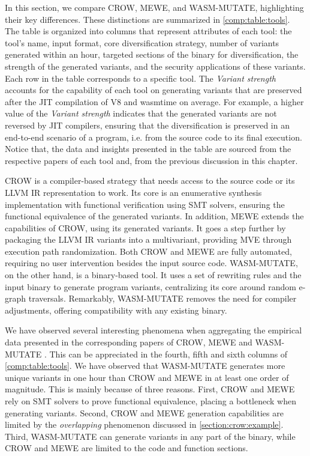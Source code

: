 
\label{discussion}

In this section, we compare CROW, MEWE, and WASM-MUTATE, highlighting their key differences. 
These distinctions are summarized in \autoref{comp:table:tools}. 
The table is organized into columns that represent attributes of each tool: the tool's name, input format, core diversification strategy, number of variants generated within an hour, targeted sections of the \Wasm binary for diversification, the strength of the generated variants, and the security applications of these variants. 
Each row in the table corresponds to a specific tool. 
The \emph{Variant strength} accounts for the capability of each tool on generating variants that are preserved after the JIT compilation of V8 and wasmtime on average.
For example, a higher value of the \emph{Variant strength} indicates that the generated variants are not reversed by JIT compilers, ensuring that the diversification is preserved in an end-to-end scenario of a \Wasm program, i.e. from the source code to its final execution.
Notice that, the data and insights presented in the table are sourced from the respective papers of each tool and, from the previous discussion in this chapter.


CROW is a compiler-based strategy that needs access to the source code or its LLVM IR representation to work. 
Its core is an enumerative synthesis implementation with functional verification using SMT solvers, ensuring the functional equivalence of the generated variants.
In addition, MEWE extends the capabilities of CROW, using its generated variants. 
It goes a step further by packaging the LLVM IR variants into a  \Wasm multivariant, providing MVE through execution path randomization.
Both CROW and MEWE are fully automated, requiring no user intervention besides the input source code.
WASM-MUTATE, on the other hand, is a binary-based tool.
It uses a set of rewriting rules and the input \wasm binary to generate program variants, centralizing its core around random e-graph traversals. 
Remarkably, WASM-MUTATE removes the need for compiler adjustments, offering compatibility with any existing \Wasm binary. 


We have observed several interesting phenomena when aggregating the empirical data presented in the corresponding papers of CROW, MEWE and WASM-MUTATE \cite{CROW,MEWE, wasmmutate}. 
This can be appreciated in the fourth, fifth and sixth columns of \autoref{comp:table:tools}.
We have observed that WASM-MUTATE generates more unique variants in one hour than CROW and MEWE in at least one order of magnitude.
This is mainly because of three reasons.
First, CROW and MEWE rely on SMT solvers to prove functional equivalence, placing a bottleneck when generating variants.
Second, CROW and MEWE generation capabilities are limited by the \emph{overlapping} phenomenon discussed in \autoref{section:crow:example}.
Third, WASM-MUTATE can generate variants in any part of the \wasm binary, while CROW and MEWE are limited to the code and function sections.


